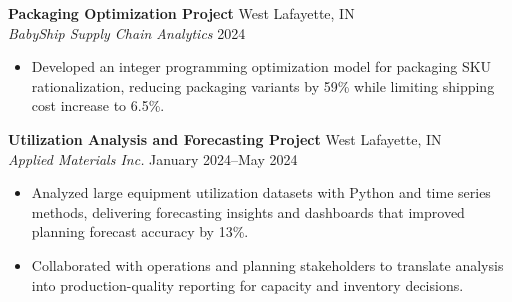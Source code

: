 \documentclass[11pt,a4paper]{article}
\begin{document}
\noindent
\textbf{Packaging Optimization Project} \hfill West Lafayette, IN \\
\textit{BabyShip Supply Chain Analytics} \hfill 2024
\begin{itemize}[leftmargin=*, noitemsep, topsep=0pt]
    \item Developed an integer programming optimization model for packaging SKU rationalization, reducing packaging variants by 59\% while limiting shipping cost increase to 6.5\%.
\end{itemize}
\vspace{6pt}

\noindent
\textbf{Utilization Analysis and Forecasting Project} \hfill West Lafayette, IN \\
\textit{Applied Materials Inc.} \hfill January 2024--May 2024
\begin{itemize}[leftmargin=*, noitemsep, topsep=0pt]
    \item Analyzed large equipment utilization datasets with Python and time series methods, delivering forecasting insights and dashboards that improved planning forecast accuracy by 13\%.
    \item Collaborated with operations and planning stakeholders to translate analysis into production-quality reporting for capacity and inventory decisions.
\end{itemize}
\end{document}
